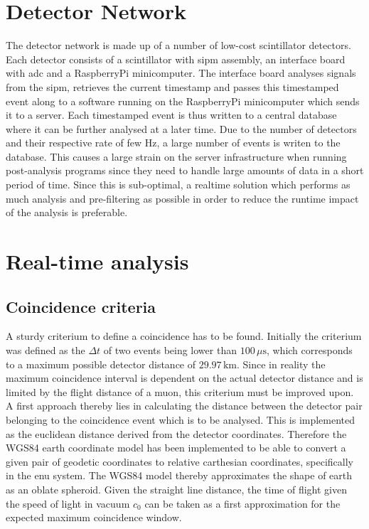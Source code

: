 \documentclass[abstract,toc,los,english,11pt,glossaries]{jluthesis}
\begin{document}
\section{Detector Network}
The detector network is made up of a number of low-cost scintillator detectors. Each detector consists of a scintillator with \acrfull{sipm} assembly, an interface board with \acrfull{adc} and a RaspberryPi minicomputer. The interface board analyses signals from the \acrshort{sipm}, retrieves the current timestamp and passes this timestamped event along to a software running on the RaspberryPi minicomputer which sends it to a server. Each timestamped event is thus written to a central database where it can be further analysed at a later time. Due to the number of detectors and their respective rate of few Hz, a large number of events is writen to the database. This causes a large strain on the server infrastructure when running post-analysis programs since they need to handle large amounts of data in a short period of time. Since this is sub-optimal, a realtime solution which performs as much analysis and pre-filtering as possible in order to reduce the runtime impact of the analysis is preferable.

\section{Real-time analysis}
\subsection{Coincidence criteria}
A sturdy criterium to define a coincidence has to be found. Initially the criterium was defined as the $\Delta{t}$ of two events being lower than $100\,\mu\text{s}$, which corresponds to a maximum possible detector distance of $29.97\,\text{km}$. Since in reality the maximum coincidence interval is dependent on the actual detector distance and is limited by the flight distance of a muon, this criterium must be improved upon. A first approach thereby lies in calculating the distance between the detector pair belonging to the coincidence event which is to be analysed. This is implemented as the euclidean distance derived from the detector coordinates. Therefore the WGS84 earth coordinate model has been implemented to be able to convert a given pair of geodetic coordinates to relative carthesian coordinates, specifically in the \acrfull{enu} system. The WGS84 model thereby approximates the shape of earth as an oblate spheroid. Given the straight line distance, the time of flight given the speed of light in vacuum $c_0$ can be taken as a first approximation for the expected maximum coincidence window.
\end{document}
